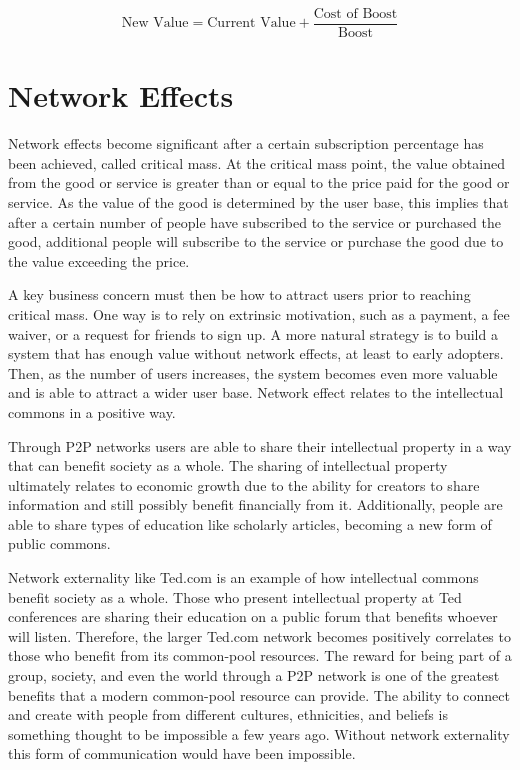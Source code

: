 \begin{equation}
	\textrm{New Value} = \textrm{Current Value} + \frac{\textrm{Cost of Boost}}{\textrm{Boost}}
\end{equation}

\section{Network Effects}

Network effects become significant after a certain subscription percentage has been achieved, called critical mass. At the critical mass point, the value obtained from the good or service is greater than or equal to the price paid for the good or service. As the value of the good is determined by the user base, this implies that after a certain number of people have subscribed to the service or purchased the good, additional people will subscribe to the service or purchase the good due to the value exceeding the price.

A key business concern must then be how to attract users prior to reaching critical mass. One way is to rely on extrinsic motivation, such as a payment, a fee waiver, or a request for friends to sign up. A more natural strategy is to build a system that has enough value without network effects, at least to early adopters. Then, as the number of users increases, the system becomes even more valuable and is able to attract a wider user base. Network effect relates to the intellectual commons in a positive way.

Through P2P networks users are able to share their intellectual property in a way that can benefit society as a whole. The sharing of intellectual property ultimately relates to economic growth due to the ability for creators to share information and still possibly benefit financially from it. Additionally, people are able to share types of education like scholarly articles, becoming a new form of public commons.

Network externality like Ted.com is an example of how intellectual commons benefit society as a whole. Those who present intellectual property at Ted conferences are sharing their education on a public forum that benefits whoever will listen. Therefore, the larger Ted.com network becomes positively correlates to those who benefit from its common-pool resources. The reward for being part of a group, society, and even the world through a P2P network is one of the greatest benefits that a modern common-pool resource can provide. The ability to connect and create with people from different cultures, ethnicities, and beliefs is something thought to be impossible a few years ago. Without network externality this form of communication would have been impossible.

